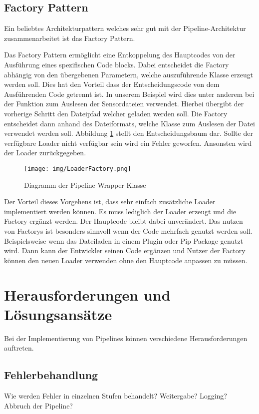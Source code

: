 \documentclass[a4paper]{article} %
\begin{document}
\subsection{Factory Pattern}
Ein beliebtes Architekturpattern welches sehr gut mit der Pipeline-Architektur zusammenarbeitet ist das Factory Pattern.

Das Factory Pattern ermöglicht eine Entkoppelung des Hauptcodes von der Ausführung eines spezifischen Code blocks. Dabei entscheidet die Factory abhängig von den übergebenen Parametern, welche auszuführende Klasse erzeugt werden soll. Dies hat den Vorteil dass der Entscheidungscode von dem Ausführenden Code getrennt ist. In unserem Beispiel wird dies unter anderem bei der Funktion zum Auslesen der Sensordateien verwendet. Hierbei übergibt der vorherige Schritt den Dateipfad welcher geladen werden soll. Die Factory entscheidet dann anhand des Dateiformats, welche Klasse zum Auslesen der Datei verwendet werden soll. Abbildung \ref{fig:loaderFactory} stellt den Entscheidungsbaum dar. Sollte der verfügbare Loader nicht verfügbar sein wird ein Fehler geworfen. Ansonsten wird der Loader zurückgegeben.

\begin{figure}[htbp] %
    \centering %
    \texttt{[image: img/LoaderFactory.png]} %
    \caption{Diagramm der Pipeline Wrapper Klasse} %
    \label{fig:loaderFactory} %
\end{figure}
Der Vorteil dieses Vorgehens ist, dass sehr einfach zusätzliche Loader implementiert werden können. Es muss lediglich der Loader erzeugt und die Factory ergänzt werden. Der Hauptcode bleibt dabei unverändert.
Das nutzen von Factorys ist besonders sinnvoll wenn der Code mehrfach genutzt werden soll. Beispielsweise wenn das Dateiladen in einem Plugin oder Pip Package genutzt wird. Dann kann der Entwickler seinen Code ergänzen und Nutzer der Factory können den neuen Loader verwenden ohne den Hauptcode anpassen zu müssen.



\section{Herausforderungen und Lösungsansätze}
Bei der Implementierung von Pipelines können verschiedene Herausforderungen auftreten.
\subsection{Fehlerbehandlung}
Wie werden Fehler in einzelnen Stufen behandelt? Weitergabe? Logging? Abbruch der Pipeline?
\lipsum[19-21]
\end{document}
